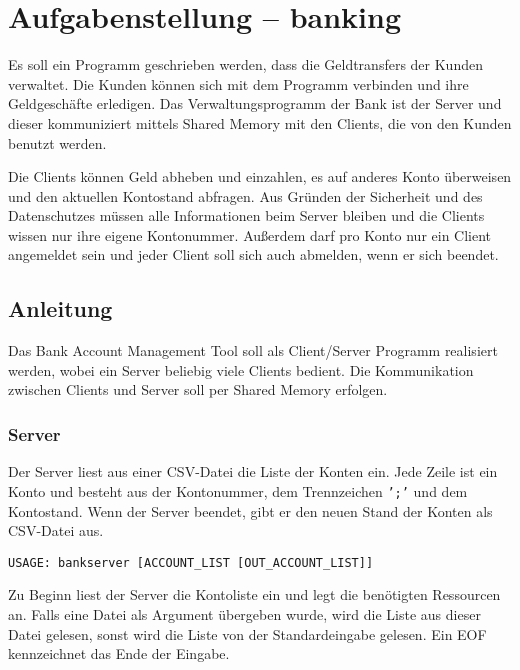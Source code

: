 




\section*{Aufgabenstellung -- banking}

Es soll ein Programm geschrieben werden, dass die Geldtransfers der Kunden
verwaltet. Die Kunden können sich mit dem Programm verbinden und ihre
Geldgeschäfte erledigen. Das Verwaltungsprogramm der Bank ist der Server und
dieser kommuniziert mittels Shared Memory mit den Clients, die von den Kunden
benutzt werden.

Die Clients können Geld abheben und einzahlen, es auf anderes Konto überweisen
und den aktuellen Kontostand abfragen. Aus Gründen der Sicherheit und des
Datenschutzes müssen alle Informationen beim Server bleiben und die Clients
wissen nur ihre eigene Kontonummer. Außerdem darf pro Konto nur ein Client
angemeldet sein und jeder Client soll sich auch abmelden, wenn er sich beendet.



\subsection*{Anleitung}

Das Bank Account Management Tool soll als Client/Server Programm realisiert
werden, wobei ein Server beliebig viele Clients bedient. Die Kommunikation
zwischen Clients und Server soll per Shared Memory erfolgen.

\subsubsection*{Server}
\label{sec:server}

Der Server liest aus einer CSV-Datei die Liste der Konten ein. Jede Zeile ist
ein Konto und besteht aus der Kontonummer, dem Trennzeichen \texttt{';'} und
dem Kontostand. Wenn der Server beendet, gibt er den neuen Stand der Konten als
CSV-Datei aus.

\begin{verbatim}
USAGE: bankserver [ACCOUNT_LIST [OUT_ACCOUNT_LIST]]
\end{verbatim}

Zu Beginn liest der Server die Kontoliste ein und legt die benötigten
Ressourcen an. Falls eine Datei als Argument übergeben wurde, wird die Liste
aus dieser Datei gelesen, sonst wird die Liste von der Standardeingabe gelesen.
Ein EOF kennzeichnet das Ende der Eingabe.

